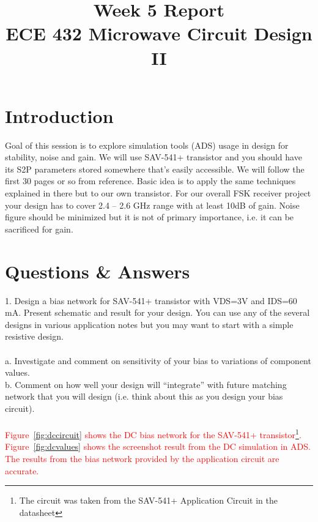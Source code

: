 \documentclass[conference]{IEEEtran}
\begin{document}
\title{Week 5 Report\\ECE 432 Microwave Circuit Design II}
\author{
}
\maketitle
\IEEEpeerreviewmaketitle
\section{Introduction}
Goal of this session is to explore simulation tools (ADS) usage in design for stability, noise and gain. We will use SAV-541+ transistor and you should have its S2P parameters stored somewhere that’s easily accessible. We will follow the first 30 pages or so from reference\cite{payne}. Basic idea is to apply the same techniques explained in there but to our own transistor. For our overall FSK receiver project your design has to cover 2.4 – 2.6 GHz range with at least 10dB of gain. Noise figure should be minimized but it is not of primary importance, i.e. it can be sacrificed for gain.
\section{Questions \& Answers}
1. Design a bias network for SAV-541+ transistor with VDS=3V and IDS=60 mA. Present schematic and result for your design. You can use any of the several designs in various application notes but you may want to start with a simple resistive design.\\\\
a. Investigate and comment on sensitivity of your bias to variations of component values.\\
b. Comment on how well your design will “integrate” with future matching network that you will design (i.e. think about this as you design your bias circuit).\\\\
\textcolor{red}{Figure~\ref{fig:dccircuit} shows the DC bias network for the SAV-541+ transistor\footnote{The circuit was taken from the SAV-541+ Application Circuit in the datasheet}.  Figure~\ref{fig:dcvalues} shows the screenshot result from the DC simulation in ADS.  The results from the bias network provided by the application circuit are accurate.}
\end{document}
